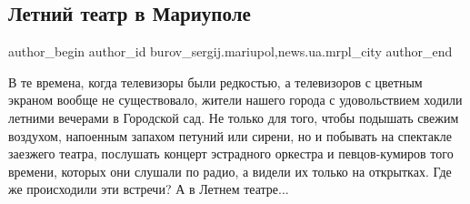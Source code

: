  
 
 
 
 
 
\subsection{Летний театр в Мариуполе}
\label{sec:27_07_2019.stz.news.ua.mrpl_city.1.letnii_teatr_v_mariupole}
 
\ifcmt
 author_begin
   author_id burov_sergij.mariupol,news.ua.mrpl_city
 author_end
\fi


В те времена, когда телевизоры были редкостью, а телевизоров с цветным экраном
вообще не существовало, жители нашего города с удовольствием ходили летними
вечерами в Городской сад. Не только для того, чтобы подышать свежим воздухом,
напоенным запахом петуний или сирени, но и побывать на спектакле заезжего
театра, послушать концерт эстрадного оркестра и певцов-кумиров того времени,
которых они слушали по радио, а видели их только на открытках. Где же
происходили эти встречи? А в Летнем театре...

